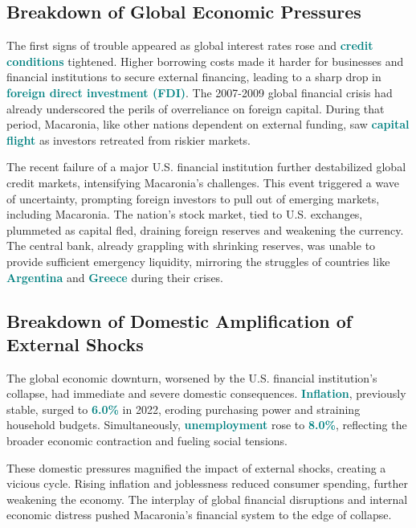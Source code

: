 \subsection*{Breakdown of Global Economic Pressures}  
The first signs of trouble appeared as global interest rates rose and \textbf{\textcolor{teal}{credit conditions}} tightened. Higher borrowing costs made it harder for businesses and financial institutions to secure external financing, leading to a sharp drop in \textbf{\textcolor{teal}{foreign direct investment (FDI)}}. The 2007-2009 global financial crisis had already underscored the perils of overreliance on foreign capital. During that period, Macaronia, like other nations dependent on external funding, saw \textbf{\textcolor{teal}{capital flight}} as investors retreated from riskier markets.  

The recent failure of a major U.S. financial institution further destabilized global credit markets, intensifying Macaronia’s challenges. This event triggered a wave of uncertainty, prompting foreign investors to pull out of emerging markets, including Macaronia. The nation’s stock market, tied to U.S. exchanges, plummeted as capital fled, draining foreign reserves and weakening the currency. The central bank, already grappling with shrinking reserves, was unable to provide sufficient emergency liquidity, mirroring the struggles of countries like \textbf{\textcolor{teal}{Argentina}} and \textbf{\textcolor{teal}{Greece}} during their crises.  


\subsection*{Breakdown of Domestic Amplification of External Shocks}  
The global economic downturn, worsened by the U.S. financial institution’s collapse, had immediate and severe domestic consequences. \textbf{\textcolor{teal}{Inflation}}, previously stable, surged to \textbf{\textcolor{teal}{6.0\%}} in 2022, eroding purchasing power and straining household budgets. Simultaneously, \textbf{\textcolor{teal}{unemployment}} rose to \textbf{\textcolor{teal}{8.0\%}}, reflecting the broader economic contraction and fueling social tensions.  

These domestic pressures magnified the impact of external shocks, creating a vicious cycle. Rising inflation and joblessness reduced consumer spending, further weakening the economy. The interplay of global financial disruptions and internal economic distress pushed Macaronia’s financial system to the edge of collapse.  



